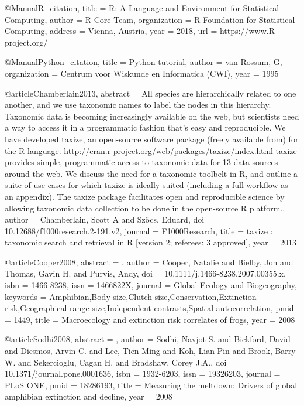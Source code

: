 {{{{{{@Manual{R_citation,
   title = {R: A Language and Environment for Statistical Computing},
   author = {{R Core Team}},
   organization = {R Foundation for Statistical Computing},
   address = {Vienna, Austria},
   year = {2018},
   url = {https://www.R-project.org/}
  }
  
  @Manual{Python_citation,
   title = {Python tutorial},
   author = {{van Rossum, G}},
   organization = {Centrum voor Wiskunde en Informatica (CWI)},
   year = {1995}
  }


  @article{Chamberlain2013,
abstract = {All species are hierarchically related to one another, and we use taxonomic names to label the nodes in this hierarchy. Taxonomic data is becoming increasingly available on the web, but scientists need a way to access it in a programmatic fashion that's easy and reproducible. We have developed taxize, an open-source software package (freely available from) for the R language. http://cran.r-project.org/web/packages/taxize/index.html taxize provides simple, programmatic access to taxonomic data for 13 data sources around the web. We discuss the need for a taxonomic toolbelt in R, and outline a suite of use cases for which taxize is ideally suited (including a full workflow as an appendix). The taxize package facilitates open and reproducible science by allowing taxonomic data collection to be done in the open-source R platform.},
author = {Chamberlain, Scott A and Sz{\"{o}}cs, Eduard},
doi = {10.12688/f1000research.2-191.v2},
journal = {F1000Research},
title = {{taxize : taxonomic search and retrieval in R [version 2; referees: 3 approved]}},
year = {2013}
}



@article{Cooper2008,
abstract = {},
author = {Cooper, Natalie and Bielby, Jon and Thomas, Gavin H. and Purvis, Andy},
doi = {10.1111/j.1466-8238.2007.00355.x},
isbn = {1466-8238},
issn = {1466822X},
journal = {Global Ecology and Biogeography},
keywords = {Amphibian,Body size,Clutch size,Conservation,Extinction risk,Geographical range size,Independent contrasts,Spatial autocorrelation},
pmid = {1449},
title = {{Macroecology and extinction risk correlates of frogs}},
year = {2008}
}

@article{Sodhi2008,
abstract = {},
author = {Sodhi, Navjot S. and Bickford, David and Diesmos, Arvin C. and Lee, Tien Ming and Koh, Lian Pin and Brook, Barry W. and Sekercioglu, Cagan H. and Bradshaw, Corey J.A.},
doi = {10.1371/journal.pone.0001636},
isbn = {1932-6203},
issn = {19326203},
journal = {PLoS ONE},
pmid = {18286193},
title = {{Measuring the meltdown: Drivers of global amphibian extinction and decline}},
year = {2008}
}

}}}}}}
